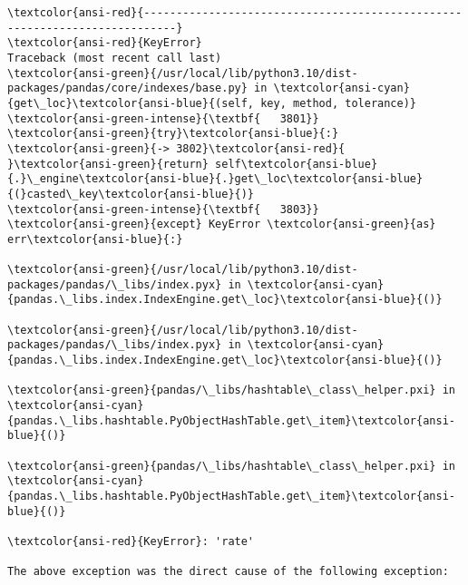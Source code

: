 \documentclass[11pt]{article}
\begin{document}
    \begin{Verbatim}[commandchars=\\\{\}, frame=single, framerule=2mm, rulecolor=\color{outerrorbackground}]
\textcolor{ansi-red}{---------------------------------------------------------------------------}
\textcolor{ansi-red}{KeyError}                                  Traceback (most recent call last)
\textcolor{ansi-green}{/usr/local/lib/python3.10/dist-packages/pandas/core/indexes/base.py} in \textcolor{ansi-cyan}{get\_loc}\textcolor{ansi-blue}{(self, key, method, tolerance)}
\textcolor{ansi-green-intense}{\textbf{   3801}}             \textcolor{ansi-green}{try}\textcolor{ansi-blue}{:}
\textcolor{ansi-green}{-> 3802}\textcolor{ansi-red}{                 }\textcolor{ansi-green}{return} self\textcolor{ansi-blue}{.}\_engine\textcolor{ansi-blue}{.}get\_loc\textcolor{ansi-blue}{(}casted\_key\textcolor{ansi-blue}{)}
\textcolor{ansi-green-intense}{\textbf{   3803}}             \textcolor{ansi-green}{except} KeyError \textcolor{ansi-green}{as} err\textcolor{ansi-blue}{:}

\textcolor{ansi-green}{/usr/local/lib/python3.10/dist-packages/pandas/\_libs/index.pyx} in \textcolor{ansi-cyan}{pandas.\_libs.index.IndexEngine.get\_loc}\textcolor{ansi-blue}{()}

\textcolor{ansi-green}{/usr/local/lib/python3.10/dist-packages/pandas/\_libs/index.pyx} in \textcolor{ansi-cyan}{pandas.\_libs.index.IndexEngine.get\_loc}\textcolor{ansi-blue}{()}

\textcolor{ansi-green}{pandas/\_libs/hashtable\_class\_helper.pxi} in \textcolor{ansi-cyan}{pandas.\_libs.hashtable.PyObjectHashTable.get\_item}\textcolor{ansi-blue}{()}

\textcolor{ansi-green}{pandas/\_libs/hashtable\_class\_helper.pxi} in \textcolor{ansi-cyan}{pandas.\_libs.hashtable.PyObjectHashTable.get\_item}\textcolor{ansi-blue}{()}

\textcolor{ansi-red}{KeyError}: 'rate'

The above exception was the direct cause of the following exception:


\end{Verbatim}
\end{document}
